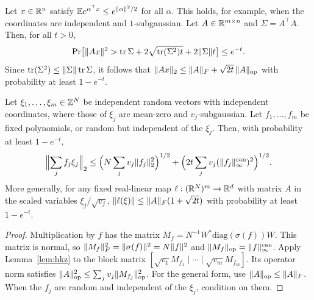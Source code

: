 \begin{lemma}\label{lem:hkz}
Let $x\in\mathbb{R}^n$ satisfy $\mathbb{E} e^{\alpha^\top x}\le e^{\lVert \alpha\rVert^2/2}$ for all $\alpha$. This holds, for example, when the coordinates are independent and $1$-subgaussian. Let $A\in\mathbb{R}^{m\times n}$ and $\Sigma=A^\top A$. Then, for all $t>0$,
\[
  \Pr\bigl[\lVert Ax\rVert^2>\operatorname{tr}\Sigma+2\sqrt{\operatorname{tr}(\Sigma^2)t}+2\lVert \Sigma\rVert t\bigr]\le e^{-t}.
\]
Since $\operatorname{tr}(\Sigma^2)\le\lVert \Sigma\rVert\operatorname{tr}\Sigma$, it follows that $\lVert Ax\rVert_2\le\lVert A\rVert_F+\sqrt{2t}\,\lVert A\rVert_{\mathrm{op}}$ with probability at least $1-e^{-t}$.
\end{lemma}

\begin{corollary}\label{cor:polyhkz}
Let $\xi_1,\dots,\xi_m\in\mathbb{Z}^N$ be independent random vectors with independent coordinates, where those of $\xi_j$ are mean-zero and $v_j$-subgaussian. Let $f_1,\dots,f_m$ be fixed polynomials, or random but independent of the $\xi_j$. Then, with probability at least $1-e^{-t}$,
\[
  \Bigl\|\sum_j f_j\xi_j\Bigr\|_2\le\Bigl(N\sum_jv_j\lVert f_j\rVert_2^2\Bigr)^{1/2}+\Bigl(2t\sum_jv_j(\lVert f_j\rVert^{\mathrm{can}}_{\infty})^2\Bigr)^{1/2}.
\]
More generally, for any fixed real-linear map $\ell:(\mathbb{R}^N)^m\to\mathbb{R}^d$ with matrix $A$ in the scaled variables $\xi_j/\sqrt{v_j}$, $\lVert \ell(\xi)\rVert\le\lVert A\rVert_F(1+\sqrt{2t})$ with probability at least $1-e^{-t}$.
\end{corollary}
\begin{proof}
Multiplication by $f$ has the matrix $M_f=N^{-1}W^*\mathrm{diag}(\sigma(f))W$. This matrix is normal, so $\lVert M_f\rVert_F^2=\lVert \sigma(f)\rVert^2=N\lVert f\rVert^2$ and $\lVert M_f\rVert_{\mathrm{op}}=\lVert f\rVert^{\mathrm{can}}_{\infty}$. Apply Lemma~\ref{lem:hkz} to the block matrix $[\sqrt{v_1}M_{f_1}\mid\cdots\mid\sqrt{v_m}M_{f_m}]$. Its operator norm satisfies $\lVert A\rVert_{\mathrm{op}}^2\le\sum_jv_j\lVert M_{f_j}\rVert_{\mathrm{op}}^2$. For the general form, use $\lVert A\rVert_{\mathrm{op}}\le\lVert A\rVert_F$. When the $f_j$ are random and independent of the $\xi_j$, condition on them.
\end{proof}


